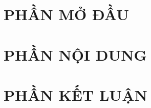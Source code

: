 \documentclass[10pt,a5paper,oneside]{memoir}
\begin{document}
	
  
\chapter{PHẦN MỞ ĐẦU}	

\chapter{PHẦN NỘI DUNG}

\chapter{PHẦN KẾT LUẬN}

\end{document}
